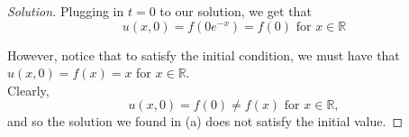\documentclass[11pt]{article}
\newenvironment{solution}
  {\renewcommand\qedsymbol{$\blacksquare$}\begin{proof}[Solution]}
  {\end{proof}}
\begin{document}
\begin{enumerate}[(a)]
\begin{solution}
      Plugging in $t=0$ to our solution, we get that \[ u(x, 0) = f(0e^{-x}) = f(0) \text{ for } x \in \mathbb{R} \]
  
      However, notice that to satisfy the initial condition, we must have that $u(x, 0) = f(x) = x$ for $x\in \mathbb{R}$. \\
  
      Clearly, \[ u(x, 0) = f(0) \neq f(x) \text{ for } x \in \mathbb{R}, \] and so the solution we found in (a) does not satisfy the initial value.
      \end{solution}
\end{enumerate}
\end{document}
